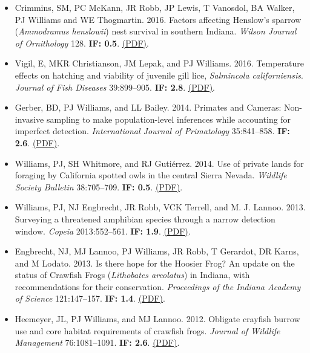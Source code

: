 \begin{itemize}
\item Crimmins, SM, PC McKann, JR Robb, JP Lewis, T Vanosdol, BA Walker, PJ Williams and WE Thogmartin. 2016. Factors affecting Henslow's sparrow (\emph{Ammodramus henslowii}) nest survival in southern Indiana. \emph{Wilson Journal of Ornithology} 128. \textbf{IF: 0.5}. \href{http://www.perrywilliams.us/wp-content/uploads/2023/05/crimmins2016factors.pdf}{(PDF)}.
\item Vigil, E, MKR Christianson, JM Lepak, and PJ Williams. 2016. Temperature effects on hatching and viability of juvenile gill lice, \emph{Salmincola californiensis}. \emph{Journal of Fish Diseases} 39:899--905. \textbf{IF: 2.8}. \href{http://www.perrywilliams.us/wp-content/uploads/2023/05/vigel2016temperature.pdf}{(PDF)}.
\item Gerber, BD, PJ Williams, and LL Bailey. 2014. Primates and Cameras: Non-invasive sampling to make population-level inferences while accounting for imperfect detection. \emph{International Journal of Primatology} 35:841--858. \textbf{IF: 2.6}. \href{http://www.perrywilliams.us/wp-content/uploads/2023/05/gerber2014noninvasive.pdf}{(PDF)}.
\item Williams, PJ, SH Whitmore, and RJ Guti\'errez. 2014. Use of private lands for foraging by California spotted owls in the central Sierra Nevada. \emph{Wildlife Society Bulletin} 38:705--709. \textbf{IF: 0.5}. \href{http://www.perrywilliams.us/wp-content/uploads/2023/05/williams2014use.pdf}{(PDF)}.
\item Williams, PJ, NJ Engbrecht, JR Robb, VCK Terrell, and M. J. Lannoo. 2013. Surveying a threatened amphibian species through a narrow detection window. \emph{Copeia} 2013:552--561. \textbf{IF: 1.9}. \href{http://www.perrywilliams.us/wp-content/uploads/2023/05/williams2013surveying.pdf}{(PDF)}.
\item Engbrecht, NJ, MJ Lannoo, PJ Williams, JR Robb, T Gerardot, DR Karns, and M Lodato. 2013. Is there hope for the Hoosier Frog? An update on the status of Crawfish Frogs (\emph{Lithobates areolatus}) in Indiana, with recommendations for their conservation. \emph{Proceedings of the Indiana Academy of Science} 121:147--157. \textbf{IF: 1.4}. \href{http://www.perrywilliams.us/wp-content/uploads/2023/05/engbrecht2013hope.pdf}{(PDF)}.
\item Heemeyer, JL, PJ Williams, and MJ Lannoo. 2012. Obligate crayfish burrow use and core habitat requirements of crawfish frogs. \emph{Journal of Wildlife Management} 76:1081--1091. \textbf{IF: 2.6}. \href{http://www.perrywilliams.us/wp-content/uploads/2023/05/heemeyer2012obligate.pdf}{(PDF)}.

\end{itemize}
